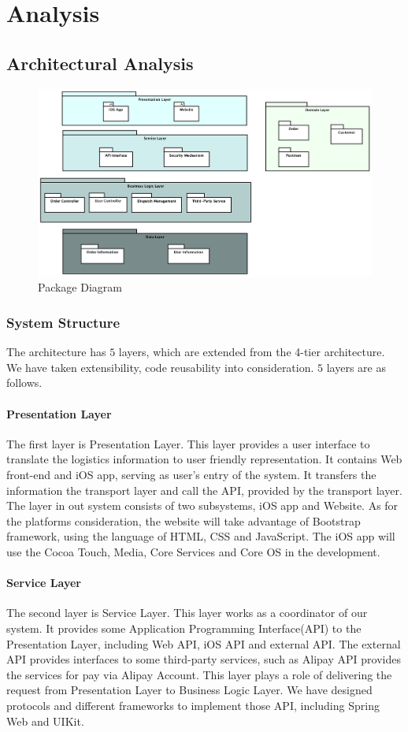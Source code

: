 \documentclass[12pt]{scrreprt}
\begin{document}
\chapter{Analysis}
\section{Architectural Analysis}
\begin{figure}[H]
  \centering\includegraphics[width=6in]{DocumentRes/PackageDiagram.png}
  \caption{Package Diagram}
\end{figure}
\subsection{System Structure}
The architecture has $5$ layers, which are extended from the 4-tier architecture.
We have taken extensibility, code reusability into consideration. $5$ layers
are as follows.
\subsubsection{Presentation Layer}
The first layer is Presentation Layer. This layer provides a user interface to
translate the logistics information to user friendly representation. It contains
Web front-end and iOS app, serving as user's entry of the system. It transfers
the information the transport layer and call the API, provided by the transport
layer. The layer in out system consists of two subsystems, iOS app and Website.
As for the platforms consideration, the website will take advantage of Bootstrap
framework, using the language of HTML, CSS and JavaScript. The iOS app will use
the Cocoa Touch, Media, Core Services and Core OS in the development.
\subsubsection{Service Layer}
The second layer is Service Layer. This layer works as a coordinator of our
system. It provides some Application Programming Interface(API) to the
Presentation Layer, including Web API, iOS API and external API. The external
API provides interfaces to some third-party services, such as Alipay API
provides the services for pay via Alipay Account. This layer plays a role
of delivering the request from Presentation Layer to Business Logic Layer.
We have designed protocols and different frameworks to implement those API,
including Spring Web and UIKit.
\end{document}
